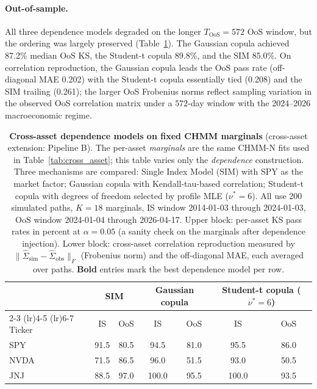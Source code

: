 \paragraph{Out-of-sample.}
All three dependence models degraded on the longer $T_{\text{OoS}} = 572$ OoS window, but the ordering was largely preserved (Table~\ref{tab:cross_asset_sim_copula}).
The Gaussian copula achieved 87.2\% median OoS KS, the Student-t copula 89.8\%, and the SIM 85.0\%.
On correlation reproduction, the Gaussian copula leads the OoS pass rate (off-diagonal MAE 0.202) with the Student-t copula essentially tied (0.208) and the SIM trailing (0.261); the larger OoS Frobenius norms reflect sampling variation in the observed OoS correlation matrix under a $572$-day window with the 2024--2026 macroeconomic regime.

\begin{table}[t]
\centering
\caption{\textbf{Cross-asset dependence models on fixed CHMM marginals} (cross-asset extension: Pipeline B). The per-asset \emph{marginals} are the same CHMM-N fits used in Table~\ref{tab:cross_asset}; this table varies only the \emph{dependence} construction. Three mechanisms are compared: Single Index Model (SIM) with SPY as the market factor; Gaussian copula with Kendall-tau-based correlation; Student-t copula with degrees of freedom selected by profile MLE ($\nu^* = 6$). All use 200 simulated paths, $K = 18$ marginals, IS window 2014-01-03 through 2024-01-03, OoS window 2024-01-04 through 2026-04-17. Upper block: per-asset KS pass rates in percent at $\alpha = 0.05$ (a sanity check on the marginals after dependence injection). Lower block: cross-asset correlation reproduction measured by $\|\hat{\Sigma}_{\text{sim}} - \hat{\Sigma}_{\text{obs}}\|_F$ (Frobenius norm) and the off-diagonal MAE, each averaged over paths. \textbf{Bold} entries mark the best dependence model per row.}
\label{tab:cross_asset_sim_copula}
\small
\begin{tabular}{l cc cc cc}
\toprule
& \multicolumn{2}{c}{SIM} & \multicolumn{2}{c}{Gaussian copula} & \multicolumn{2}{c}{Student-t copula ($\nu^* = 6$)} \\
\cmidrule(lr){2-3} \cmidrule(lr){4-5} \cmidrule(lr){6-7}
Ticker & IS & OoS & IS & OoS & IS & OoS \\
\midrule
SPY   & 91.5 & 80.5 & 94.5 & 81.0 & 95.5  & 86.0 \\
NVDA  & 71.5 & 86.5 & 96.0 & 51.5 & 93.0  & 50.5 \\
JNJ   & 88.5 & 97.0 & 100.0 & 95.5 & 100.0 & 93.5 \\

\end{tabular}
\end{table}
